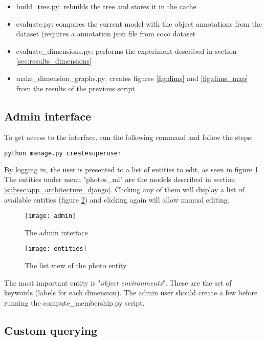 \begin{itemize}
\item{build\_tree.py: rebuilds the tree and stores it in the cache}
\item{evaluate.py: compares the current model with the object annotations from the dataset (requires a annotation json file from coco dataset}
\item{evaluate\_dimensions.py: performs the experiment described in section \ref{sec:results_dimensions}}
\item{make\_dimension\_graphs.py: creates figures \ref{fig:dims} and \ref{fig:dims_map} from the results of the previous script}
\end{itemize}

\subsection{Admin interface}
\label{subsec:app_usage_admin}

To get access to the interface, run the following command and follow the steps:

\begin{lstlisting}[language=Bash]
python manage.py createsuperuser
\end{lstlisting}

By logging in, the user is presented to a list of entities to edit, as seen in figure \ref{fig:admin}. The entities under menu "photos\_ml" are the models described in section \ref{subsec:app_architecture_django}. Clicking any of them will display a list of available entities (figure \ref{fig:entities}) and clicking again will allow manual editing.

\begin{figure}[b!]
\centering
\texttt{[image: admin]}
\caption{The admin interface}
\label{fig:admin}
\end{figure}

\begin{figure}[b!]
\centering
\texttt{[image: entities]}
\caption{The list view of the photo entity}
\label{fig:entities}
\end{figure}

The most important entity is "\textit{object environments}". These are the set of keywords (labels for each dimension). The admin user should create a few before running the compute\_membership.py script.

\subsection{Custom querying}
\label{subsec:app_usage_querying}

